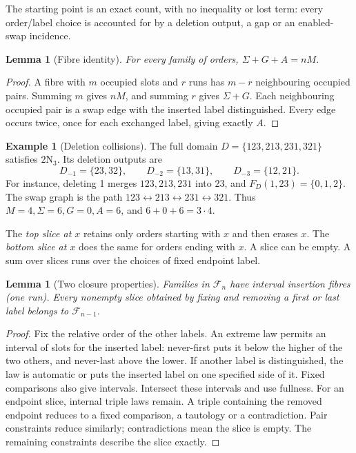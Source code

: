 \documentclass[11pt,letterpaper]{article}
\newtheorem{lemma}[theorem]{Lemma}
\theoremstyle{definition}
\newtheorem{example}[theorem]{Example}
\newcommand{\F}{\mathcal F}
\newcommand{\Sig}{\Sigma}
\newcommand{\N}[2]{#1\mathrm N_{#2}}
\begin{document}
The starting point is an exact count, with no inequality or lost term:
every order/label choice is accounted for by a deletion output, a gap
or an enabled-swap incidence.
\begin{lemma}[Fibre identity]\label{lem:fibre}
For every family of orders,
\(\boxed{\Sig+G+A=nM}\).
\end{lemma}
\begin{proof}
A fibre with \(m\) occupied slots and \(r\) runs has \(m-r\)
neighbouring occupied pairs. Summing \(m\) gives \(nM\), and summing
\(r\) gives \(\Sig+G\). Each neighbouring occupied pair is a swap
edge with the inserted label distinguished. Every edge occurs twice,
once for each exchanged label, giving exactly \(A\).
\end{proof}

\begin{example}[Deletion collisions]\label{ex:four}
The full domain \(D=\{123,213,231,321\}\) satisfies \(\N23\).
Its deletion outputs are
\[
 D_{-1}=\{23,32\},\qquad D_{-2}=\{13,31\},\qquad
 D_{-3}=\{12,21\}.
\]
For instance, deleting 1 merges \(123,213,231\) into 23, and
\(F_D(1,23)=\{0,1,2\}\). The swap graph is the path
\(123\leftrightarrow213\leftrightarrow231\leftrightarrow321\).
Thus \(M=4,\Sig=6,G=0,A=6\), and \(6+0+6=3\cdot4\).
\end{example}

The \emph{top slice at \(x\)} retains only orders starting with \(x\)
and then erases \(x\). The \emph{bottom slice at \(x\)} does the same
for orders ending with \(x\). A slice can be empty. A sum over slices
runs over the choices of fixed endpoint label.
\begin{lemma}[Two closure properties]\label{lem:interval}
Families in \(\F_n\) have interval insertion fibres (one run). Every nonempty
slice obtained by fixing and removing a first or last label belongs
to \(\F_{n-1}\).
\end{lemma}
\begin{proof}
Fix the relative order of the other labels. An extreme law permits
an interval of slots for the inserted label: never-first puts it
below the higher of the two others, and never-last above the lower.
If another label is distinguished, the law is automatic or puts the
inserted label on one specified side of it. Fixed comparisons also
give intervals. Intersect these intervals and use fullness.
For an endpoint slice, internal triple laws remain. A triple containing
the removed endpoint reduces to a fixed comparison, a tautology or a
contradiction. Pair constraints reduce similarly; contradictions mean
the slice is empty. The remaining constraints describe the slice exactly.
\end{proof}
\end{document}
